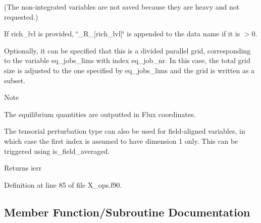 (The non-\/integrated variables are not saved because they are heavy and not requested.)

If {\ttfamily rich\+\_\+lvl} is provided, {\ttfamily \char`\"{}\+\_\+\+R\+\_\+\mbox{[}rich\+\_\+lvl\mbox{]}\char`\"{}} is appended to the data name if it is {\ttfamily $>$0}.

Optionally, it can be specified that this is a divided parallel grid, corresponding to the variable {\ttfamily eq\+\_\+jobs\+\_\+lims} with index {\ttfamily eq\+\_\+job\+\_\+nr}. In this case, the total grid size is adjusted to the one specified by {\ttfamily eq\+\_\+jobs\+\_\+lims} and the grid is written as a subset. \begin{DoxyNote}{Note}

\begin{DoxyEnumerate}
\item The equilibrium quantities are outputted in Flux coordinates.
\item The tensorial perturbation type can also be used for field-\/aligned variables, in which case the first index is assumed to have dimension 1 only. This can be triggered using {\ttfamily is\+\_\+field\+\_\+averaged}.
\end{DoxyEnumerate}
\end{DoxyNote}
\begin{DoxyReturn}{Returns}
ierr 
\end{DoxyReturn}


Definition at line 85 of file X\+\_\+ops.\+f90.



\subsection{Member Function/\+Subroutine Documentation}
\mbox{\label{interfacex__ops_1_1print__output__x_af66cca1a3bd819c6eefe69974af7166d}} 
